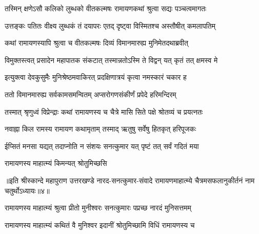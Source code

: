  

\twolineshloka
{तस्मिन् क्षणेऽसौ कलिको लुब्धको वीतकल्मषः}
{रामायणकथां श्रुत्वा सद्यः पञ्चत्वमागतः}%

 

\twolineshloka
{उत्तङ्कः पतितः वीक्ष्य लुब्धकं तं दयापरः}
{एतद् दृष्ट्वा विस्मितश्च अस्तौषीत् कमलापतिम्}%

 

\twolineshloka
{कथां रामायणस्यापि श्रुत्वा च वीतकल्मषः}
{दिव्यं विमानमारुह्य मुनिमेतदथाब्रवीत्}%

 

\twolineshloka
{विमुक्तस्त्वत् प्रसादेन महापातक संकटात्}
{तस्मान्नतोऽस्मि ते विद्वन् यत् कृतं तत् क्षमस्व मे}%

 


\twolineshloka
{इत्युक्त्वा देवकुसुमैः मुनिश्रेष्ठमवाकिरत्}
{प्रदक्षिणात्रयं कृत्वा नमस्कारं चकार ह}%

 

\twolineshloka
{ततो विमानमारुह्य सर्वकामसमन्वितम्}
{अप्सरोगणसंकीर्णं प्रपेदे हरिमन्दिरम्}%

 

\twolineshloka
{तस्मात् श्रृणुध्वं विप्रेन्द्राः कथां रामायणस्य च}
{चैत्रे मासि सिते पक्षे श्रोतव्यं च प्रयत्‍नतः}%

 

\twolineshloka
{नवाह्ना किल रामस्य रामायण कथामृताम्}
{तस्माद् ऋतुषु सर्वेषु हितकृत् हरिपूजकः}%

 

\twolineshloka
{ईप्सितं मनसा यद्यत् तदाप्नोति न संशयः}
{सनत्कुमार यत् पृष्टं तत् सर्वं गदितं मया}%

 
\onelineshloka
{रामायणस्य माहात्म्यं किमन्यत् श्रोतुमिच्छसि}%

 

॥इति श्रीस्कान्दे महापुराण उत्तरखण्डे नारद-सनत्कुमार-संवादे रामायणमाहात्म्ये चैत्रमसफलानुकीर्तनं नाम चतुर्थोऽध्यायः॥४॥



 


\twolineshloka
{रामायणस्य माहात्म्यं श्रुत्वा प्रीतो मुनीश्वरः}
{सनत्कुमारः पप्रच्छ नारदं मुनिसत्तमम्}%

 


\twolineshloka
{रामायणस्य माहात्म्यं कथितं वै मुनिश्वर}
{इदानीं श्रोतुमिच्छामि विधिं रामायणस्य च}%

